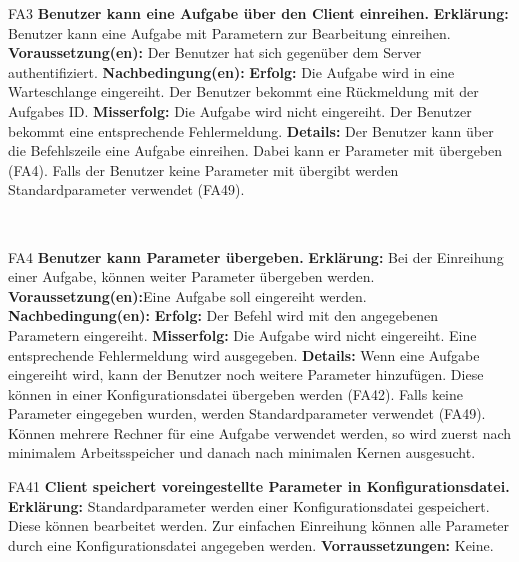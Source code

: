 \documentclass[a4paper,12pt]{article}
\begin{document}
\begin{itemize}[nosep]
    \begin{minipage}[t] {\linewidth}
    	\item[FA3] \textbf{Benutzer kann eine \gls{Aufgabe} über den \gls{Client} einreihen.}
    	\subitem \textbf{Erklärung:} \gls{Benutzer} kann eine \gls{Aufgabe} mit \gls{Parameter}n zur Bearbeitung einreihen.
    	\subitem \textbf{Voraussetzung(en):} Der \gls{Benutzer} hat sich gegenüber dem \gls{Server} authentifiziert.
    	\subitem \textbf{Nachbedingung(en):}
    	\subsubitem \textbf{Erfolg:} Die \gls{Aufgabe} wird in eine \gls{Warteschlange} eingereiht. Der \gls{Benutzer} bekommt eine Rückmeldung mit der \glspl{Aufgabe} ID.
    	\subsubitem \textbf{Misserfolg:} Die \gls{Aufgabe} wird nicht eingereiht. Der \gls{Benutzer} bekommt eine entsprechende Fehlermeldung.
    	\subitem \textbf{Details:} Der \gls{Benutzer} kann über die \gls{Befehlszeile} eine \gls{Aufgabe} einreihen. Dabei kann er \gls{Parameter} mit übergeben (FA4). Falls der \gls{Benutzer} keine \gls{Parameter} mit übergibt werden Standardparameter verwendet (FA49).
   \end{minipage}
   \newline
   \\
	
	\begin{minipage}[t]{\linewidth}
		\item[FA4] \textbf{Benutzer kann \gls{Parameter} übergeben.}
		\subitem \textbf{Erklärung:} Bei der Einreihung einer \gls{Aufgabe}, können weiter \gls{Parameter} übergeben werden.
		\subitem \textbf{Voraussetzung(en):}Eine \gls{Aufgabe} soll eingereiht werden.
		\subitem \textbf{Nachbedingung(en):}
		\subsubitem \textbf{Erfolg:} Der Befehl wird mit den angegebenen \gls{Parameter}n eingereiht.
		\subsubitem \textbf{Misserfolg:} Die \gls{Aufgabe} wird nicht eingereiht. Eine entsprechende Fehlermeldung wird ausgegeben.
		\subitem \textbf{Details:} Wenn eine \gls{Aufgabe} eingereiht wird, kann der \gls{Benutzer} noch weitere \gls{Parameter} hinzufügen. Diese können in einer \gls{Konfigurationsdatei} übergeben werden (FA42). Falls keine \gls{Parameter} eingegeben wurden, werden Standardparameter verwendet (FA49).
		Können mehrere Rechner für eine \gls{Aufgabe} verwendet werden, so wird zuerst nach minimalem Arbeitsspeicher und danach nach minimalen Kernen ausgesucht.
	\end{minipage}
	
	\begin{minipage}[t]{\linewidth}
		\item[FA41] \textbf{\gls{Client} speichert voreingestellte \gls{Parameter} in \gls{Konfigurationsdatei}.}
		\subitem \textbf{Erklärung:} Standardparameter werden einer \gls{Konfigurationsdatei} gespeichert.
		Diese können bearbeitet werden. Zur einfachen Einreihung können alle \gls{Parameter} durch eine \gls{Konfigurationsdatei} angegeben werden.
		\subitem \textbf{Vorraussetzungen:} Keine.
		

\end{minipage}
\end{itemize}
\end{document}
